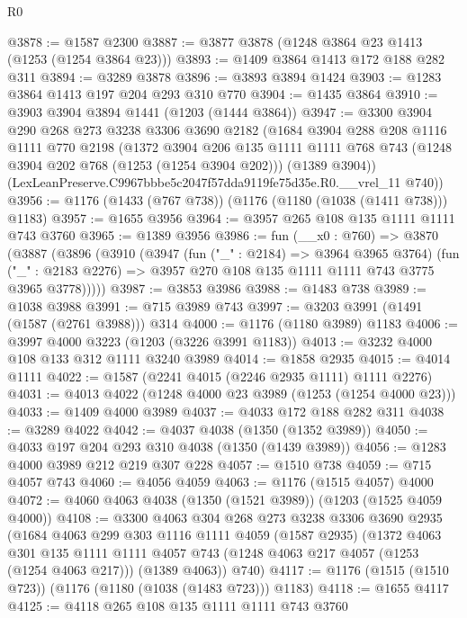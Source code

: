 \begin{lexlean}{R0}
\begin{coremodule}
@3878 := @1587 @2300
@3887 := @3877 @3878 (@1248 @3864 @23 @1413 (@1253 (@1254 @3864 @23)))
@3893 := @1409 @3864 @1413 @172 @188 @282 @311
@3894 := @3289 @3878
@3896 := @3893 @3894 @1424
@3903 := @1283 @3864 @1413 @197 @204 @293 @310 @770
@3904 := @1435 @3864
@3910 := @3903 @3904 @3894 @1441 (@1203 (@1444 @3864))
@3947 := @3300
    @3904
    @290
    @268
    @273
    @3238
    @3306
    @3690
    @2182
    (@1684
      @3904
      @288
      @208
      @1116
      @1111
      @770
      @2198
      (@1372
        @3904
        @206
        @135
        @1111
        @1111
        @768
        @743
        (@1248 @3904 @202 @768 (@1253 (@1254 @3904 @202)))
        (@1389 @3904))
      (LexLeanPreserve.C9967bbbe5c2047f57dda9119fe75d35e.R0.__vrel_11 @740))
@3956 := @1176 (@1433 (@767 @738)) (@1176 (@1180 (@1038 (@1411 @738))) @1183)
@3957 := @1655 @3956
@3964 := @3957 @265 @108 @135 @1111 @1111 @743 @3760
@3965 := @1389 @3956
@3986 := fun (__x0 : @760) =>
  @3870
    (@3887
      (@3896
        (@3910
          (@3947
            (fun ("_" : @2184) => @3964 @3965 @3764)
            (fun ("_" : @2183 @2276) => @3957 @270 @108 @135 @1111 @1111 @743 @3775 @3965 @3778)))))
@3987 := @3853 @3986
@3988 := @1483 @738
@3989 := @1038 @3988
@3991 := @715 @3989 @743
@3997 := @3203 @3991 (@1491 (@1587 (@2761 @3988))) @314
@4000 := @1176 (@1180 @3989) @1183
@4006 := @3997 @4000 @3223 (@1203 (@3226 @3991 @1183))
@4013 := @3232 @4000 @108 @133 @312 @1111 @3240 @3989
@4014 := @1858 @2935
@4015 := @4014 @1111
@4022 := @1587 (@2241 @4015 (@2246 @2935 @1111) @1111 @2276)
@4031 := @4013 @4022 (@1248 @4000 @23 @3989 (@1253 (@1254 @4000 @23)))
@4033 := @1409 @4000 @3989
@4037 := @4033 @172 @188 @282 @311
@4038 := @3289 @4022
@4042 := @4037 @4038 (@1350 (@1352 @3989))
@4050 := @4033 @197 @204 @293 @310 @4038 (@1350 (@1439 @3989))
@4056 := @1283 @4000 @3989 @212 @219 @307 @228
@4057 := @1510 @738
@4059 := @715 @4057 @743
@4060 := @4056 @4059
@4063 := @1176 (@1515 @4057) @4000
@4072 := @4060 @4063 @4038 (@1350 (@1521 @3989)) (@1203 (@1525 @4059 @4000))
@4108 := @3300
    @4063
    @304
    @268
    @273
    @3238
    @3306
    @3690
    @2935
    (@1684
      @4063
      @299
      @303
      @1116
      @1111
      @4059
      (@1587 @2935)
      (@1372
        @4063
        @301
        @135
        @1111
        @1111
        @4057
        @743
        (@1248 @4063 @217 @4057 (@1253 (@1254 @4063 @217)))
        (@1389 @4063))
      @740)
@4117 := @1176 (@1515 (@1510 @723)) (@1176 (@1180 (@1038 (@1483 @723))) @1183)
@4118 := @1655 @4117
@4125 := @4118 @265 @108 @135 @1111 @1111 @743 @3760

\end{coremodule}
\end{lexlean}
